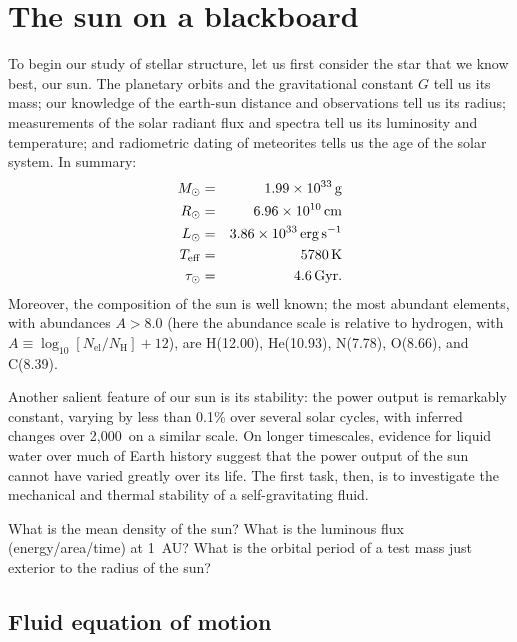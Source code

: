 \chapter{The sun on a blackboard}\label{ch.introduction}

To begin our study of stellar structure, let us first consider the star that we know best, our sun.  The planetary orbits and the gravitational constant $G$ tell us its mass; our knowledge of the earth-sun distance and observations tell us its radius; measurements of the solar radiant flux and spectra tell us its luminosity and temperature; and radiometric dating of meteorites tells us the age of the solar system. In summary:
\begin{eqnarray*}
M_{\odot} &=& 1.99\times 10^{33}\,\mathrm{g}\\
R_{\odot} &=& 6.96\times 10^{10}\,\mathrm{c}\mathrm{m}\\
L_{\odot} &=& 3.86\times 10^{33}\,\mathrm{erg}\,{\mathrm{s}}^{-1}\\
T_{\mathrm{eff}} &=& 5780\,\mathrm{K}\\
\tau_{\odot} &=& 4.6\,\mathrm{G}\mathrm{yr}.
\end{eqnarray*}
Moreover, the composition of the sun is well known\cite{anders.grevesse:abundances,Asplund2005The-Solar-Chemi}; the most abundant elements, with abundances $A > 8.0$ (here the abundance scale is relative to hydrogen, with $A \equiv \log_{10}[N_{\mathrm{el}}/N_{\mathrm{H}}] + 12$), are H(12.00), He(10.93), N(7.78), O(8.66), and C(8.39).

Another salient feature of our sun is its stability: the power output is remarkably constant, varying by less than 0.1\% over several solar cycles\cite{Willson1991The-suns-lumino}, with inferred changes over 2,000\nsp\yr\ on a similar scale\cite{Frohlich2004Solar-radiative}.  On longer timescales, evidence for liquid water over much of Earth history suggest that the power output of the sun cannot have varied greatly over its life.  The first task, then, is to investigate the mechanical and thermal stability of a self-gravitating fluid.

\begin{exercisebox}
What is the mean density of the sun? What is the luminous flux (energy/area/time) at 1~AU? What is the orbital period of a test mass just exterior to the radius of the sun?
\end{exercisebox}

\section{Fluid equation of motion}\label{s.fluid-introduction}

